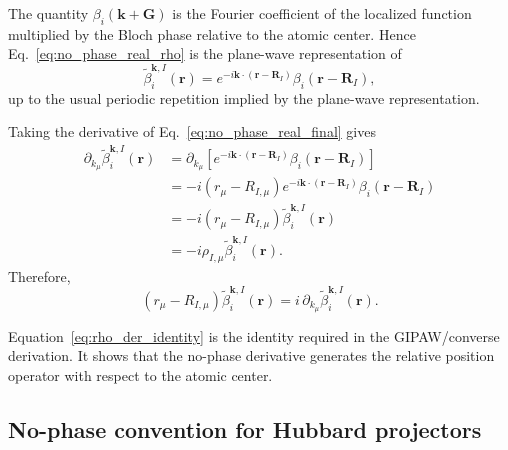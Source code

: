 \documentclass[11pt]{article}
\begin{document}
The quantity $\beta_i(\mathbf k+\mathbf G)$ is the Fourier coefficient
of the localized function multiplied by the Bloch phase relative to the
atomic center. Hence Eq.~\eqref{eq:no_phase_real_rho} is the
plane-wave representation of
\begin{equation}
\widetilde{\beta}_{i}^{\mathbf k,I}(\mathbf r)
=
e^{-i\mathbf k\cdot(\mathbf r-\mathbf R_I)}
\beta_i(\mathbf r-\mathbf R_I),
\label{eq:no_phase_real_final}
\end{equation}
up to the usual periodic repetition implied by the plane-wave
representation.

Taking the derivative of Eq.~\eqref{eq:no_phase_real_final} gives
\begin{align}
\partial_{k_\mu}
\widetilde{\beta}_{i}^{\mathbf k,I}(\mathbf r)
&=
\partial_{k_\mu}
\left[
e^{-i\mathbf k\cdot(\mathbf r-\mathbf R_I)}
\beta_i(\mathbf r-\mathbf R_I)
\right]
\nonumber\\
&=
-i(r_\mu-R_{I,\mu})
e^{-i\mathbf k\cdot(\mathbf r-\mathbf R_I)}
\beta_i(\mathbf r-\mathbf R_I)
\nonumber\\
&=
-i(r_\mu-R_{I,\mu})
\widetilde{\beta}_{i}^{\mathbf k,I}(\mathbf r)
\nonumber\\
&=
-i\rho_{I,\mu}
\widetilde{\beta}_{i}^{\mathbf k,I}(\mathbf r).
\label{eq:no_phase_der_real}
\end{align}
Therefore,
\begin{equation}
(r_\mu-R_{I,\mu})
\widetilde{\beta}_{i}^{\mathbf k,I}(\mathbf r)
=
i\,
\partial_{k_\mu}
\widetilde{\beta}_{i}^{\mathbf k,I}(\mathbf r).
\label{eq:rho_der_identity}
\end{equation}

Equation~\eqref{eq:rho_der_identity} is the identity required in the
GIPAW/converse derivation. It shows that the no-phase derivative
generates the relative position operator with respect to the atomic
center.

\subsection{No-phase convention for Hubbard projectors}
\label{app:hubbard_no_phase}
\end{document}
